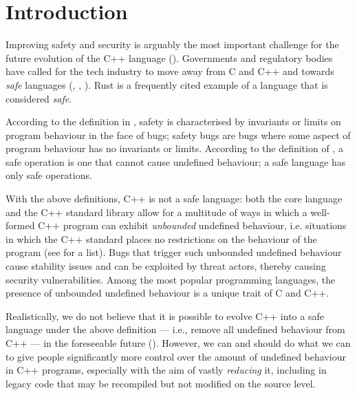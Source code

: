 
\tableofcontents*
\pagebreak





\section{Introduction}
\label{intro}

Improving safety and security is arguably the most important challenge for the future evolution of the C++ language (\cite{Bastien2023}). Governments and regulatory bodies have called for the tech industry to move away from C and C++ and towards \emph{safe} languages (\cite{NSA2022}, \cite{CR2023}, \cite{CISA2023}). Rust is a frequently cited example of a language that is considered \emph{safe}.

According to the definition in \cite{Carruth2023}, safety is characterised by invariants or limits on program behaviour in the face of bugs; safety bugs are bugs where some aspect of program behaviour has no invariants or limits. According to the definition of \cite{Abrahams2023}, a safe operation is one that cannot cause undefined behaviour; a safe language has only safe operations.

With the above definitions, C++ is not a safe language: both the core language and the C++ standard library allow for a multitude of ways in which a well-formed C++ program can exhibit \emph{unbounded} undefined behaviour, i.e. situations in which the C++ standard places no restrictions on the behaviour of the program (see \cite{P1705R1} for a list). Bugs that trigger such unbounded undefined behaviour cause stability issues and can be exploited by threat actors, thereby causing security vulnerabilities. Among the most popular programming languages, the presence of unbounded undefined behaviour is a unique trait of C and C++. 

Realistically, we do not believe that it is possible to evolve C++ into a safe language under the above definition --- i.e., remove all undefined behaviour from C++ --- in the foreseeable future (\cite{Doumler2023}). However, we can and should do what we can to give people significantly more control over the amount of undefined behaviour in C++ programs, especially with the aim of vastly \emph{reducing} it, including in legacy code that may be recompiled but not modified on the source level.


